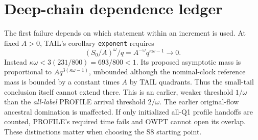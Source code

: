 \documentclass[11pt]{article}
\begin{document}
\section{Deep-chain dependence ledger}\label{an04crav1:ledger}
The first failure depends on which statement within an increment is used.
At fixed \(A>0\), TAIL's corollary \texttt{exponent} requires
\[
 (S_0/A)^\omega/q=A^{-\omega}q^{\kappa\omega-1}\to0 .
\]
Instead \(\kappa\omega<3(231/800)=693/800<1\). Its proposed asymptotic
mass is proportional to \(Aq^{3(\kappa\omega-1)}\), unbounded although
the nominal-clock reference mass is bounded by a constant times \(A\)
by TAIL quadrants. Thus the small-tail conclusion itself cannot extend
there. This is an earlier, weaker threshold \(1/\omega\) than the
\emph{all-label} PROFILE arrival threshold \(2/\omega\).
The earlier original-flow ancestral domination is unaffected.
If only initialized all-Q1 profile handoffs are counted, PROFILE's
required time fails and OWPT cannot open its overlap. These distinctions
matter when choosing the S8 starting point.
\end{document}
